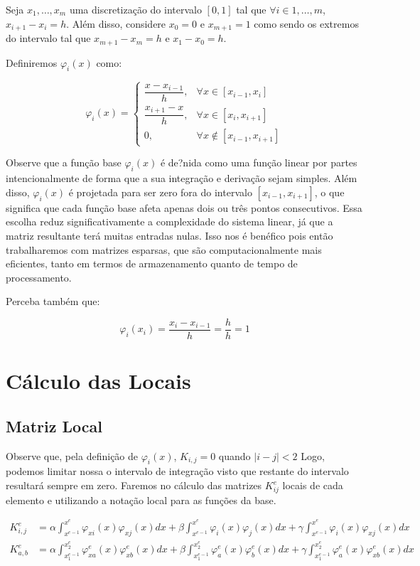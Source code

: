   Seja $x_1, \dots, x_m$ uma discretização do intervalo $[0, 1]$ tal que $\forall i \in {1, \dots, m}$, $x_{i+1} - x_i = h$. Além disso, considere $x_0 = 0$ e $x_{m+1} = 1$ como sendo os extremos do intervalo tal que $x_{m+1} - x_m = h$ e $x_1 - x_0 = h$.

  Definiremos $\varphi_i(x)$ como:

  \[\varphi_i(x) = \begin{cases}
    \dfrac{x - x_{i-1}}{h}, &\forall x \in [x_{i-1}, x_i] \\
    \dfrac{x_{i+1} - x}{h}, &\forall x \in [x_{i}, x_{i+1}] \\
    0 , &\forall x \notin [x_{i-1}, x_{i+1}]
  \end{cases}\]

  Observe que a função base $\varphi_i(x)$ é de?nida como uma função linear por partes intencionalmente de forma que a sua integração e derivação sejam simples. Além disso, $\varphi_i(x)$ é projetada para ser zero fora do intervalo $[x_{i-1}, x_{i+1}]$, o que significa que cada função base afeta apenas dois ou três pontos consecutivos. Essa escolha reduz significativamente a complexidade do sistema linear, já que a matriz resultante terá muitas entradas nulas. Isso nos é benéfico pois então trabalharemos com matrizes esparsas, que são computacionalmente mais eficientes, tanto em termos de armazenamento quanto de tempo de processamento.

  Perceba também que:

  \[\varphi_i(x_i) = \dfrac{x_i - x_{i-1}}{h} = \dfrac{h}{h} = 1\]

\chapter{Cálculo das Locais}

\section{Matriz Local}

  Observe que, pela definição de $\varphi_i(x)$, $K_{i,j} = 0$ quando $|i-j| < 2$ Logo, podemos limitar nossa o intervalo de integração visto que restante do intervalo resultará sempre em zero. Faremos no cálculo das matrizes $K^e_{ij}$ locais de cada elemento e utilizando a notação local para as funções da base.

  \begin{align*}
  K^{e}_{i,j} &= \alpha \int_{x^{e-1}}^{x^e} \varphi_{xi}(x) \varphi_{xj}(x) dx + \beta \int_{x^{e-1}}^{x^e} \varphi_i(x) \varphi_j(x)dx + \gamma \int_{x^{e-1}}^{x^e} \varphi_i(x) \varphi_{xj}(x) dx \\
  K^{e}_{a,b} &= \alpha \int_{x_1^{e-1}}^{x_2^e} \varphi_{xa}^e(x) \varphi_{xb}^e(x)dx + \beta \int_{x_1^{e-1}}^{x_2^e} \varphi_a^e(x) \varphi_b^e(x)dx + \gamma \int_{x_1^{e-1}}^{x_2^e} \varphi_a^e(x) \varphi_{xb}^e(x)dx
  \end{align*}

